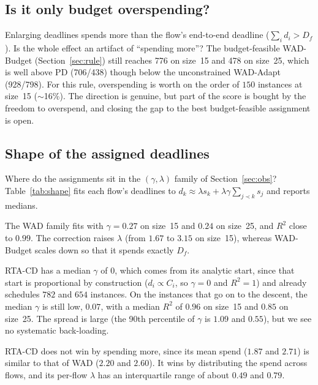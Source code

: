 \documentclass[conference]{IEEEtran}
\begin{document}
\subsection{Is it only budget overspending?}
Enlarging deadlines spends more than the flow's end-to-end deadline
($\sum_i d_i > D_f$). Is the whole effect an artifact of ``spending more''? The
budget-feasible WAD-Budget (Section~\ref{sec:rule}) still reaches 776 on size~15
and 478 on size~25, which is well above PD (706/438) though below the
unconstrained WAD-Adapt (928/798). For this rule, overspending is worth on the
order of $150$ instances at size~15 ($\sim$16\%). The direction is genuine, but
part of the score is bought by the freedom to overspend, and closing the gap to
the best budget-feasible assignment is open.

\subsection{Shape of the assigned deadlines}
Where do the assignments sit in the $(\gamma,\lambda)$ family of
Section~\ref{sec:obs}? Table~\ref{tab:shape} fits each flow's deadlines to
$d_k\approx\lambda s_k+\lambda\gamma\sum_{j\prec k}s_j$ and reports medians.

The WAD family fits with $\gamma=0.27$ on size~15 and $0.24$ on size~25, and
$R^2$ close to $0.99$. The correction raises $\lambda$ (from $1.67$ to $3.15$ on
size~15), whereas WAD-Budget scales down so that it spends exactly $D_f$.

RTA-CD has a median $\gamma$ of $0$, which comes from its analytic start, since
that start is proportional by construction ($d_i\propto C_i$, so $\gamma=0$ and
$R^2=1$) and already schedules $782$ and $654$ instances. On the instances that go
on to the descent, the median $\gamma$ is still low, $0.07$, with a median $R^2$ of
$0.96$ on size~15 and $0.85$ on size~25. The spread is large (the 90th percentile
of $\gamma$ is $1.09$ and $0.55$), but we see no systematic back-loading.

RTA-CD does not win by spending more, since its mean spend ($1.87$ and $2.71$) is
similar to that of WAD ($2.20$ and $2.60$). It wins by distributing the spend
across flows, and its per-flow $\lambda$ has an interquartile range of about
$0.49$ and $0.79$.
\end{document}
